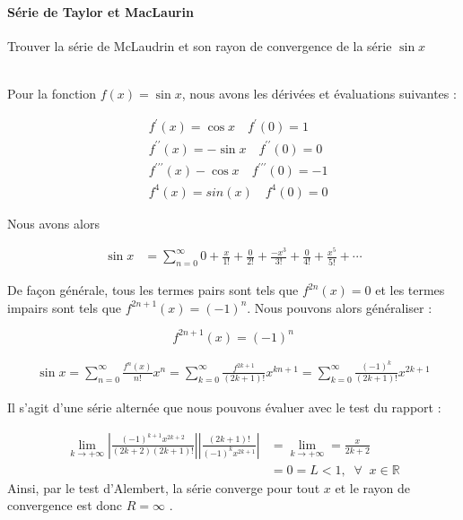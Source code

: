 \documentclass{report}
\begin{document}
\begin{multicols*}{2}
      \paragraph{Série de Taylor et MacLaurin}
      Trouver la série de McLaudrin et son rayon de convergence 
      de la série $\sin x$
      
      \mbox{}\\
      Pour la fonction $f(x) = \sin x $, nous avons les dérivées et 
      évaluations suivantes : 

      \begin{align*}
        &f^{\prime}(x) = \cos x \quad f^{\prime}(0) = 1 \\ 
        &f^{\prime\prime}(x) = -\sin x \quad f^{\prime\prime}(0) = 0 \\ 
        &f^{\prime\prime\prime}(x) -\cos x \quad 
            f^{\prime\prime\prime}(0) = -1  \\ 
        &f^{4}(x) = sin(x) \quad f^{4}(0) = 0 
      \end{align*}

      Nous avons alors 

      \begin{align*}
          \sin x &= \sum_{n=0}^{\infty } 0 + \frac{x}{1!} + \frac{0}{2!}  
          + \frac{-x^3}{3!} + \frac{0}{4!} + \frac{x^5}{5!} + \cdots   
      \end{align*}

      De façon générale, tous les termes pairs sont tels que  
      $f^{2n}(x) = 0 $ et les termes impairs sont tels que  
      $f^{2n+1}(x) = (-1)^n$. Nous pouvons alors généraliser : 

      \[ f^{2n+1}(x) = (-1)^n \]

      \begin{align*}
        \sin x = \sum_{n=0}^{\infty }\frac{f^{n}(x)}{n!}x^n  
        = \sum_{k=0}^{\infty } \frac{f^{2k+1}}{(2k+1)!}x^{kn+1}  
        = \sum_{k=0}^{\infty } \frac{(-1)^k}{(2k+1)!}x^{2k+1} 
      \end{align*}  

      Il s'agit d'une série alternée que nous pouvons évaluer avec 
      le test du rapport : 

      \begin{align*}
        \lim\limits_{k \to+\infty } \left| 
        \frac{(-1)^{k+1}x^{2k+2}}{(2k +2)(2k+ 1)!} \right|
        \left| \frac{(2k + 1)!}{(-1)^k x^{2k + 1}} \right| &=  
        \lim\limits_{k \to+\infty }  = \frac{x}{2k + 2} \\ 
        &= 
        0 = L < 1, \;\; \forall \;\; x \in \mathbb{R}
      \end{align*} 
      \noindent
      Ainsi, par le test d'Alembert, la série converge 
      pour tout $x$ et le rayon de convergence est donc 
      $R = \infty$ . 



\end{multicols*}
\end{document}
